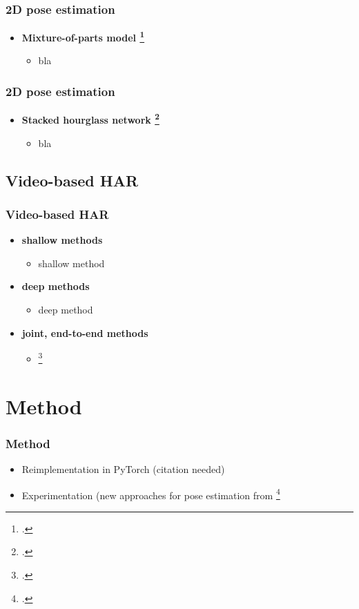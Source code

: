 \documentclass[9pt]{beamer}
\providecommand{\fcite}[1]{\footcite{#1}}
\newenvironment{myframe}[1][]{%
\begin{frame}%
\frametitle{#1}
\setcounter{footnote}{0}


}{%
\end{frame}%
}
\begin{document}
\begin{myframe}[2D pose estimation]
\begin{itemize}
  \item \textbf{Mixture-of-parts model \fcite{yang_articulated_2011}}
  \begin{itemize}
    \item bla
  \end{itemize}
\end{itemize}
\end{myframe}

\begin{myframe}[2D pose estimation]
\begin{itemize}
    \item \textbf{Stacked hourglass network \fcite{newell_stacked_2016}}
  \begin{itemize}
    \item bla
  \end{itemize}
\end{itemize}
\end{myframe}

\subsection{Video-based HAR}
\begin{myframe}[Video-based HAR]
  \begin{itemize}
    \item \textbf{shallow methods}
    \begin{itemize}
      \item shallow method
    \end{itemize}
    \item \textbf{deep methods}
    \begin{itemize}
      \item deep method
    \end{itemize}
    \item \textbf{joint, end-to-end methods}
    \begin{itemize}
        \item \fcite{luvizon_2d/3d_2018}
    \end{itemize}
  \end{itemize}
\end{myframe}

\section{Method}
\begin{myframe}[Method]
    \begin{itemize}
        \item Reimplementation in PyTorch (citation needed)
        \item Experimentation (new approaches for pose estimation from \fcite{pavllo_3d_2019}
    \end{itemize}
\end{myframe}
\end{document}
